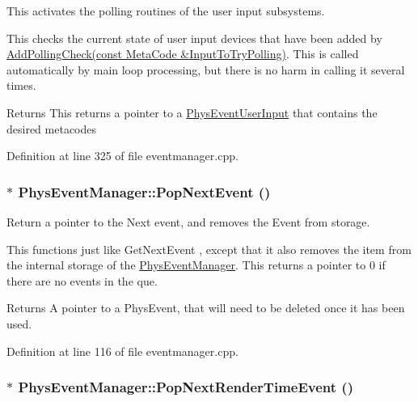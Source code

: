 This activates the polling routines of the user input subsystems. 

This checks the current state of user input devices that have been added by \hyperlink{classPhysEventManager_a1e99385441c5377a741561db581ef3ae}{AddPollingCheck(const MetaCode \&InputToTryPolling)}. This is called automatically by main loop processing, but there is no harm in calling it several times. \begin{DoxyReturn}{Returns}
This returns a pointer to a \hyperlink{classPhysEventUserInput}{PhysEventUserInput} that contains the desired metacodes 
\end{DoxyReturn}


Definition at line 325 of file eventmanager.cpp.

\hypertarget{classPhysEventManager_a23091695829acad90c499f6724fe048c}{
\subsubsection[{PopNextEvent}]{ $\ast$ PhysEventManager::PopNextEvent ()}}
\label{d5/dd7/classPhysEventManager_a23091695829acad90c499f6724fe048c}


Return a pointer to the Next event, and removes the Event from storage. 

This functions just like GetNextEvent , except that it also removes the item from the internal storage of the \hyperlink{classPhysEventManager}{PhysEventManager}. This returns a pointer to 0 if there are no events in the que. \begin{DoxyReturn}{Returns}
A pointer to a PhysEvent, that will need to be deleted once it has been used. 
\end{DoxyReturn}


Definition at line 116 of file eventmanager.cpp.

\hypertarget{classPhysEventManager_a682d25bedcbbf2c66bd8c067e67ee7f5}{
\subsubsection[{PopNextRenderTimeEvent}]{ $\ast$ PhysEventManager::PopNextRenderTimeEvent ()}}
\label{d5/dd7/classPhysEventManager_a682d25bedcbbf2c66bd8c067e67ee7f5}


